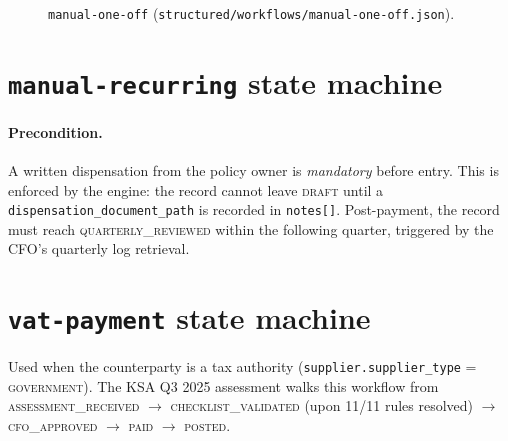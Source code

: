 \begin{figure}[htbp]
\centering
{}
\caption{\texttt{manual-one-off}
(\corpus\texttt{structured/workflows/manual-one-off.json}).}
\label{fig:manual-one-off}
\end{figure}

\section{\texttt{manual-recurring} state machine}

\paragraph{Precondition.} A written dispensation from the policy owner
is \emph{mandatory} before entry. This is enforced by the engine: the
record cannot leave \textsc{draft} until a
\texttt{dispensation\_document\_path} is recorded in \texttt{notes[]}.
Post-payment, the record must reach \textsc{quarterly\_reviewed} within
the following quarter, triggered by the CFO's quarterly log retrieval.

\section{\texttt{vat-payment} state machine}

Used when the counterparty is a tax authority
(\texttt{supplier.supplier\_type} = \textsc{government}). The KSA Q3
2025 assessment walks this workflow from
\textsc{assessment\_received} $\to$ \textsc{checklist\_validated}
(upon 11/11 rules resolved) $\to$ \textsc{cfo\_approved} $\to$
\textsc{paid} $\to$ \textsc{posted}.

